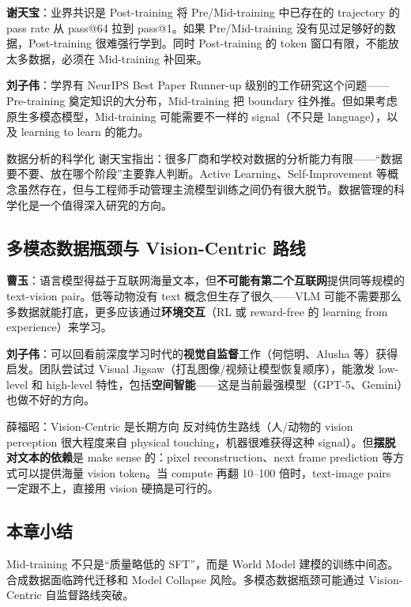 \textbf{谢天宝}：业界共识是 Post-training 将 Pre/Mid-training 中已存在的 trajectory 的 pass rate 从 pass@64 拉到 pass@1。如果 Pre/Mid-training 没有见过足够好的数据，Post-training 很难强行学到。同时 Post-training 的 token 窗口有限，不能放太多数据，必须在 Mid-training 补回来。

\textbf{刘子伟}：学界有 NeurIPS Best Paper Runner-up 级别的工作研究这个问题——Pre-training 奠定知识的大分布，Mid-training 把 boundary 往外推。但如果考虑原生多模态模型，Mid-training 可能需要不一样的 signal（不只是 language），以及 learning to learn 的能力。

\begin{knowledgebox}{数据分析的科学化}
谢天宝指出：很多厂商和学校对数据的分析能力有限——``数据要不要、放在哪个阶段''主要靠人判断。Active Learning、Self-Improvement 等概念虽然存在，但与工程师手动管理主流模型训练之间仍有很大脱节。数据管理的科学化是一个值得深入研究的方向。
\end{knowledgebox}

\subsection{多模态数据瓶颈与 Vision-Centric 路线}

\textbf{曹玉}：语言模型得益于互联网海量文本，但\textbf{不可能有第二个互联网}提供同等规模的 text-vision pair。低等动物没有 text 概念但生存了很久——VLM 可能不需要那么多数据就能打底，更多应该通过\textbf{环境交互}（RL 或 reward-free 的 learning from experience）来学习。

\textbf{刘子伟}：可以回看前深度学习时代的\textbf{视觉自监督}工作（何恺明、Alusha 等）获得启发。团队尝试过 Visual Jigsaw（打乱图像/视频让模型恢复顺序），能激发 low-level 和 high-level 特性，包括\textbf{空间智能}——这是当前最强模型（GPT-5、Gemini）也做不好的方向。

\begin{importantbox}{薛福昭：Vision-Centric 是长期方向}
反对纯仿生路线（人/动物的 vision perception 很大程度来自 physical touching，机器很难获得这种 signal）。但\textbf{摆脱对文本的依赖}是 make sense 的：pixel reconstruction、next frame prediction 等方式可以提供海量 vision token。当 compute 再翻 10--100 倍时，text-image pairs 一定跟不上，直接用 vision 硬搞是可行的。
\end{importantbox}

\subsection{本章小结}
Mid-training 不只是``质量略低的 SFT''，而是 World Model 建模的训练中间态。合成数据面临跨代迁移和 Model Collapse 风险。多模态数据瓶颈可能通过 Vision-Centric 自监督路线突破。

